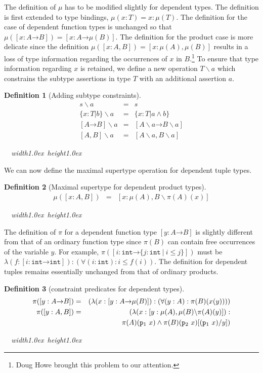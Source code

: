 \documentclass [12pt,twoside]{cslreport}
\newcommand{\thmbox}
   {{\ \hfill\hbox{%
      \vrule width1.0ex height1.0ex
   }\parfillskip 0pt }}
\newcommand{\aro}{\mathord\rightarrow} %
\newcommand{\funtype}[2]{[#1 \aro #2]}
\newcommand{\tupletype}[1]{[#1]}
\newcommand{\subtype}[3]{\{#1 : #2 | #3 \}}
\newcommand{\proj}[1]{\mathtt{p}_{#1}}
\newcommand{\ttint}{\mathtt{int}}
\newcommand{\vbar}{\ |\ }
\newtheorem{definition}{Definition}
\newenvironment{Defn}[1]{\begin{definition}[#1]\label{defn:#1}}{
\thmbox\end{definition}}
\begin{document}
\newcommand{\constrain}[2]{#1\backslash #2}
The definition of $\mu$ has to be modified slightly for dependent types.
The definition is first extended to type bindings, $\mu(x : T) = x :
\mu(T)$.  The definition for the case of dependent function types
is unchanged so that $\mu(\funtype{x : A}{B}) = \funtype{x :
A}{\mu(B)}$\@.   The definition for the product case is more delicate
since the definition $\mu(\tupletype{x : A, B}) = \tupletype{x : \mu(A),
\mu(B)}$ results in a loss of type information regarding the occurrences
of $x$ in $B$\@.\footnote{Doug Howe brought this problem to our attention.}
To ensure that type information regarding $x$ is
retained, we define a new operation $\constrain{T}{a}$
which constrains the subtype assertions in  type $T$ with an additional
assertion $a$\@.
\begin{Defn}{Adding subtype constraints}
\begin{eqnarray*}
\constrain{s}{a} & = & s \\
\constrain{\subtype{x}{T}{b}}{a} & = & \subtype{x}{T}{a \wedge b}\\
\constrain{\funtype{A}{B}}{a} & = &
\funtype{\constrain{A}{a}}{\constrain{B}{a}} \\
\constrain{\tupletype{A, B}}{a} & = & \tupletype{\constrain{A}{a}, \constrain{B}{a}}
\end{eqnarray*}
\end{Defn}

We can now define the maximal supertype operation for
dependent tuple types.
\begin{Defn}{Maximal supertype for dependent product types}
\begin{eqnarray*}
\mu(\tupletype{x : A, B}) & = & \tupletype{x : \mu(A), \constrain{B}{\pi(A)(x)}}
\end{eqnarray*}
\end{Defn}

The definition of $\pi$ for a dependent function type $\funtype{ y :
A}{B}$ is slightly different from that of an ordinary function type
since $\pi(B)$ can contain free occurrences of the variable $y$\@.
For example, $\pi(\funtype{i : \ttint}{\{j : \ttint \vbar i\leq j\}})$
must be  $\lambda (f : \funtype{i : \ttint}{\ttint}): (\forall (i:\ttint): i
\leq f(i))$\@.  The definition for dependent tuples remains essentially
unchanged from that of ordinary products.  
\begin{Defn}{constraint predicates for dependent types}
\begin{eqnarray*}
   \pi(\funtype{y:A}{B}) & = &  ( \lambda (x : \funtype{y:A}{\mu(B)}):
    (\forall (y: A): \pi(B)(x(y)))) \\
%
  \pi(\tupletype{y:A, B}) & = &
   ( \lambda (x: \tupletype{y : \mu(A), \constrain{\mu(B)}{\pi(A)(y)}}): \\&&\hspace*{.3in}
	\pi(A)(\proj{1}~x)\wedge \pi(B)(\proj{2}~x)[(\proj{1}~x)/y])
\end{eqnarray*}
\end{Defn}
\end{document}
